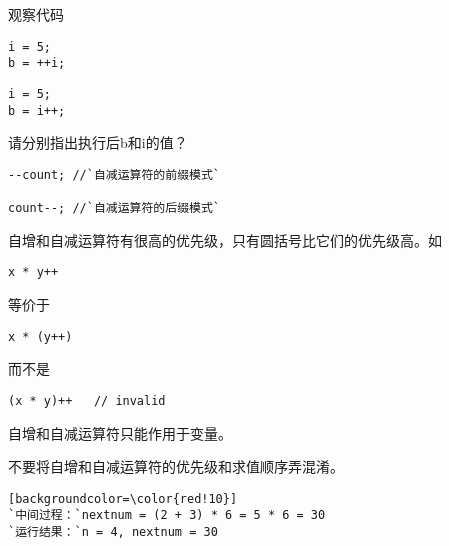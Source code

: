 \begin{frame}[fragile]
观察代码
\begin{lstlisting}[backgroundcolor=\color{red!10}]
i = 5;
b = ++i;
\end{lstlisting}
\begin{lstlisting}[backgroundcolor=\color{red!10}]
i = 5;
b = i++;
\end{lstlisting}
请分别指出执行后b和i的值？
\end{frame}

\begin{frame}[fragile]
\begin{lstlisting}[backgroundcolor=\color{red!10}]
--count; //`自减运算符的前缀模式`

count--; //`自减运算符的后缀模式`
\end{lstlisting}
\end{frame}

\begin{frame}[fragile]
自增和自减运算符有很高的优先级，只有圆括号比它们的优先级高。如
\begin{lstlisting}[backgroundcolor=\color{red!10}]
x * y++
\end{lstlisting}
等价于
\begin{lstlisting}[backgroundcolor=\color{red!10}]
x * (y++)
\end{lstlisting}
而不是
\begin{lstlisting}[backgroundcolor=\color{red!10}]
(x * y)++   // invalid
\end{lstlisting}
\textcolor{acolor1}{自增和自减运算符只能作用于变量。}
\end{frame}

\begin{frame}[fragile]
不要将自增和自减运算符的\textcolor{acolor3}{优先级和求值顺序}弄混淆。
\end{frame}

\begin{frame}[fragile]
  
\end{frame}

\begin{frame}[fragile]
\begin{lstlisting}[backgroundcolor=\color{red!10}][backgroundcolor=\color{red!10}]
`中间过程：`nextnum = (2 + 3) * 6 = 5 * 6 = 30 
`运行结果：`n = 4, nextnum = 30
\end{lstlisting}
\end{frame}

